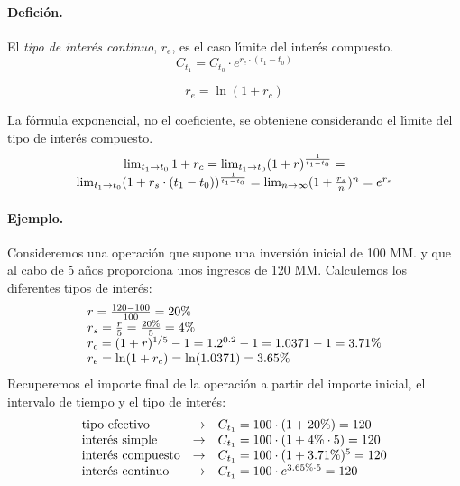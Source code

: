 \paragraph{Defici\'on.}
El \emph{tipo de inter\'es continuo}, $r_e$, es el caso
l\'\i mite del inter\'es compuesto.
\begin{equation}
C_{t_1} = C_{t_0} \cdot e^{r_e \cdot (t_1-t_0)}
\end{equation}

\begin{equation}
\label{interes_continuo_2}
r_e = \ln(1 + r_c)
\end{equation}

La f\'ormula exponencial, no el coeficiente, se obteniene considerando el
l\'\i mite del tipo de inter\'es compuesto.
\begin{equation}
\label{interes_continuo_1}
\begin{array}{c}
\lim_{t_1 \rightarrow t_0} 1+r_c = 
\lim_{t_1 \rightarrow t_0} (1 + r)^{\frac{1}{t_1 - t_0}} = \cr
\lim_{t_1 \rightarrow t_0} (1 + r_s \cdot (t_1-t_0)) ^ {\frac{1}{t_1 - t_0}} =
\lim_{n \rightarrow \infty} (1 + \frac{r_s}{n}) ^ {n} = 
e^{r_s}
\end{array}
\end{equation}

\paragraph{Ejemplo.}
Consideremos una operaci\'on que supone una inversi\'on inicial de 100 MM. y que 
al cabo de 5 a\~{n}os proporciona unos ingresos de 120 MM. 
\newline
\newline
Calculemos los diferentes tipos de inter\'es:
\begin{displaymath}
\begin{array}{l}
r = \frac{120-100}{100} = 20 \% \cr
r_s= \frac{r}{5} = \frac{20 \%}{5} = 4 \% \cr
r_c= (1+r) ^ {1/5} - 1 = 1.2^{0.2} - 1 = 1.0371 - 1 = 3.71 \% \cr
r_e= \ln(1 + r_c) = \ln(1.0371) = 3.65 \%
\end{array}
\end{displaymath}
\newline
\newline
Recuperemos el importe final de la operaci\'on a partir del importe inicial, 
el intervalo de tiempo y el tipo de inter\'es:
\begin{displaymath}
\begin{array}{lcl}
\textrm{tipo efectivo}       & \rightarrow & C_{t_1} = 100 \cdot (1 + 20\%) = 120 \cr
\textrm{inter\'es simple}    & \rightarrow & C_{t_1} = 100 \cdot (1 + 4\% \cdot 5) = 120 \cr
\textrm{inter\'es compuesto} & \rightarrow & C_{t_1} = 100 \cdot (1 + 3.71\%)^5 = 120 \cr
\textrm{inter\'es continuo}  & \rightarrow & C_{t_1} = 100 \cdot e^{3.65 \% \cdot 5} = 120
\end{array}
\end{displaymath}


